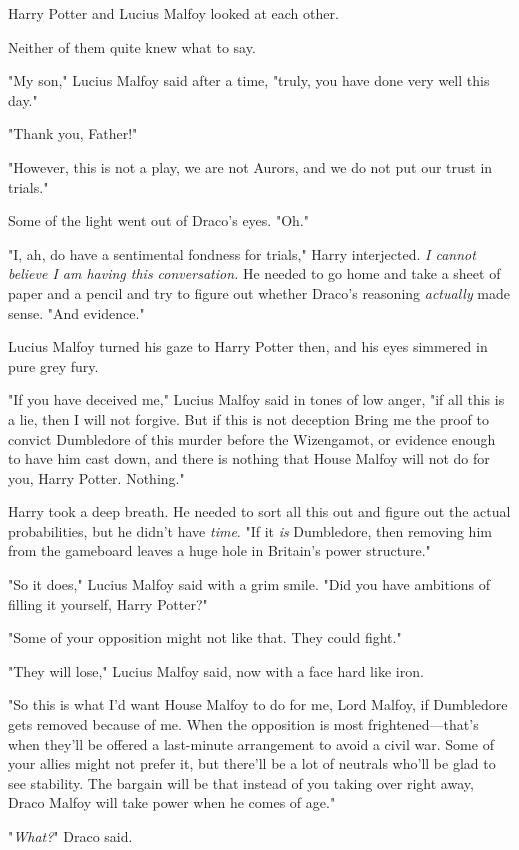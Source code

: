 Harry Potter and Lucius Malfoy looked at each other.

Neither of them quite knew what to say.

"My son," Lucius Malfoy said after a time, "truly, you have done very well this
day."

"Thank you, Father!"

"However, this is not a play, we are not Aurors, and we do not put our trust in
trials."

Some of the light went out of Draco's eyes. "Oh."

"I, ah, do have a sentimental fondness for trials," Harry interjected. \emph{I
cannot believe I am having this conversation.} He needed to go home and take a
sheet of paper and a pencil and try to figure out whether Draco's reasoning
\emph{actually} made sense. "And evidence."

Lucius Malfoy turned his gaze to Harry Potter then, and his eyes simmered in
pure grey fury.

"If you have deceived me," Lucius Malfoy said in tones of low anger, "if all
this is a lie, then I will not forgive. But if this is not deception{\el}
Bring me the proof to convict Dumbledore of this murder before the Wizengamot,
or evidence enough to have him cast down, and there is nothing that House
Malfoy will not do for you, Harry Potter. Nothing."

Harry took a deep breath. He needed to sort all this out and figure out the
actual probabilities, but he didn't have \emph{time}. "If it \emph{is}
Dumbledore, then removing him from the gameboard leaves a huge hole in
Britain's power structure."

"So it does," Lucius Malfoy said with a grim smile. "Did you have ambitions of
filling it yourself, Harry Potter?"

"Some of your opposition might not like that. They could fight."

"They will lose," Lucius Malfoy said, now with a face hard like iron.

"So this is what I'd want House Malfoy to do for me, Lord Malfoy, if Dumbledore
gets removed because of me. When the opposition is most frightened—that's
when they'll be offered a last-minute arrangement to avoid a civil war. Some of
your allies might not prefer it, but there'll be a lot of neutrals who'll be
glad to see stability. The bargain will be that instead of you taking over
right away, Draco Malfoy will take power when he comes of age."

"\emph{What?}" Draco said.

